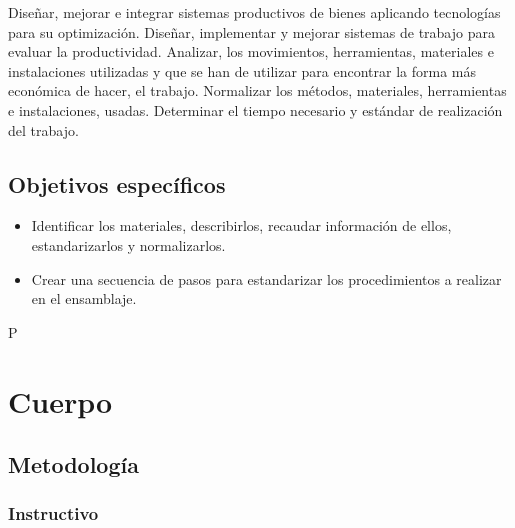     Diseñar, mejorar e integrar sistemas productivos de bienes aplicando tecnologías para su optimización. Diseñar, implementar y mejorar sistemas de trabajo para evaluar la productividad. Analizar, los movimientos, herramientas, materiales e instalaciones utilizadas y que se han de utilizar para encontrar la forma más económica de hacer, el trabajo. Normalizar los métodos, materiales, herramientas e instalaciones, usadas. Determinar el tiempo necesario y estándar de realización del trabajo.
    
    
    \subsection{Objetivos específicos}
    
    \begin{itemize}
        \item Identificar los materiales, describirlos, recaudar información de ellos, estandarizarlos y normalizarlos.
        \item Crear una secuencia de pasos para estandarizar los procedimientos a realizar en el ensamblaje.
    \end{itemize}
    P
    \section{Cuerpo }
    
    \subsection{Metodología}
    
    \subsubsection{Instructivo}
    
